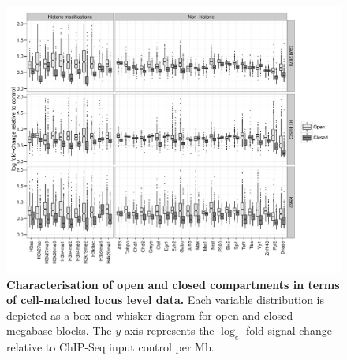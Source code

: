 \documentclass[a4paper]{report}
\newenvironment{wide}{%
  \begin{list}{}{%
      \setlength{\topsep}{0pt}%
      \addtolength{\leftmargin}{-2cm}%
      \addtolength{\rightmargin}{-2cm}%
      \setlength{\listparindent}{\parindent}%
      \setlength{\itemindent}{\parindent}%
      \setlength{\parsep}{\parskip}}%
  \item[]%
}{%
  \end{list}%
}
\begin{document}
\begin{wide}
\begin{figure}[H]
\begin{center}
\includegraphics[width=1.15\textwidth]{figs/boxcomp.pdf}
\vspace{-.5cm}
\captionsetup{width=\textwidth}
\caption{ {\bf Characterisation of open and closed compartments in
    terms of cell-matched locus level data.} Each variable
  distribution is depicted as a box-and-whisker diagram for open and
  closed megabase blocks. The $y$-axis
  represents the $\log_e$ fold signal change relative to ChIP-Seq
  input control per Mb.
}
\end{center} 
\end{figure} 
\end{wide}
\end{document}

